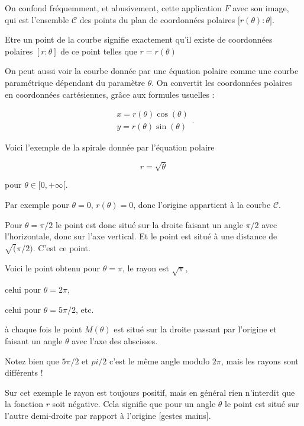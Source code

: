 \change

On confond fréquemment, et abusivement, 
cette application $F$ avec son image, qui est l'ensemble $\mathcal C$ 
des points du plan de coordonnées polaires $ \big[r(\theta):\theta\big] $.

Etre un point de la courbe signifie exactement qu'il existe  de coordonnées \\
polaires $[r:\theta]$ de ce point telles que $r=r(\theta)$

\change

On peut aussi voir la courbe donnée par une équation polaire comme une 
courbe paramétrique dépendant du paramètre $\theta$. On convertit 
les coordonnées polaires en coordonnées cartésiennes, grâce aux formules usuelles :

$$\begin{array}{l}
x=r(\theta)\cos(\theta)\\
y=r(\theta)\sin(\theta)
\end{array}
.$$



\diapo

Voici l'exemple de la spirale donnée par l'équation polaire 

$$r = \sqrt{\theta}$$

pour $\theta \in [0,+\infty[$.



Par exemple pour $\theta = 0$, $r(\theta)= 0$,
donc l'origine appartient à la courbe $\mathcal{C}$.

Pour $\theta = \pi/2$ le point est donc situé sur la droite faisant un angle $\pi/2$ avec l'horizontale,
donc sur l'axe vertical. Et le point est situé à une distance de $\sqrt(\pi/2)$. C'est ce point.

Voici le point obtenu pour $\theta = \pi$, le rayon est $\sqrt{\pi}$,

celui pour $\theta=2\pi$, 

celui pour $\theta = 5\pi/2$, etc.

à chaque fois 
le point $M(\theta)$ est situé sur la droite passant par l'origine 
et faisant un angle $\theta$ avec l'axe des abscisses.


Notez bien que $5\pi/2$ et $pi/2$ c'est le même angle modulo $2\pi$, mais
les rayons sont différents !

Sur cet exemple le rayon est toujours positif, mais en général 
rien n'interdit que la fonction $r$ soit négative. Cela signifie que pour un angle $\theta$
le point est situé sur l'autre demi-droite par rapport à l'origine [gestes mains].


